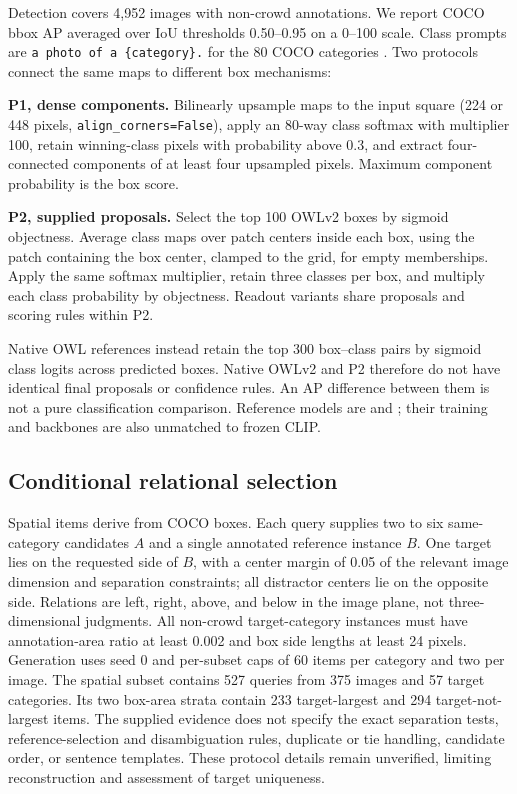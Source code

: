 \documentclass[10pt,twocolumn,letterpaper]{article}
\begin{document}
Detection covers 4,952 images with non-crowd annotations. We report COCO
bbox AP averaged over IoU thresholds 0.50--0.95 on a 0--100 scale. Class
prompts are \texttt{a\ photo\ of\ a\ \{category\}.} for the 80 COCO
categories \citep{lin2014coco}. Two protocols connect the same maps to
different box mechanisms:

\textbf{P1, dense components.} Bilinearly upsample maps to the input
square (224 or 448 pixels, \texttt{align\_corners=False}), apply an
80-way class softmax with multiplier 100, retain winning-class pixels
with probability above 0.3, and extract four-connected components of at
least four upsampled pixels. Maximum component probability is the box
score.

\textbf{P2, supplied proposals.} Select the top 100 OWLv2 boxes by
sigmoid objectness. Average class maps over patch centers inside each
box, using the patch containing the box center, clamped to the grid, for
empty memberships. Apply the same softmax multiplier, retain three
classes per box, and multiply each class probability by objectness.
Readout variants share proposals and scoring rules within P2.

Native OWL references instead retain the top 300 box--class pairs by
sigmoid class logits across predicted boxes. Native OWLv2 and P2
therefore do not have identical final proposals or confidence rules. An
AP difference between them is not a pure classification comparison.
Reference models are  and
; their training and
backbones are also unmatched to frozen CLIP.

\subsection{Conditional relational
selection}\label{conditional-relational-selection}

Spatial items derive from COCO boxes. Each query supplies two to six
same-category candidates \(A\) and a single annotated reference instance
\(B\). One target lies on the requested side of \(B\), with a center
margin of 0.05 of the relevant image dimension and separation
constraints; all distractor centers lie on the opposite side. Relations
are left, right, above, and below in the image plane, not
three-dimensional judgments. All non-crowd target-category instances
must have annotation-area ratio at least 0.002 and box side lengths at
least 24 pixels. Generation uses seed 0 and per-subset caps of 60 items
per category and two per image. The spatial subset contains 527 queries
from 375 images and 57 target categories. Its two box-area strata
contain 233 target-largest and 294 target-not-largest items. The
supplied evidence does not specify the exact separation tests,
reference-selection and disambiguation rules, duplicate or tie handling,
candidate order, or sentence templates. These protocol details remain
unverified, limiting reconstruction and assessment of target uniqueness.
\end{document}
